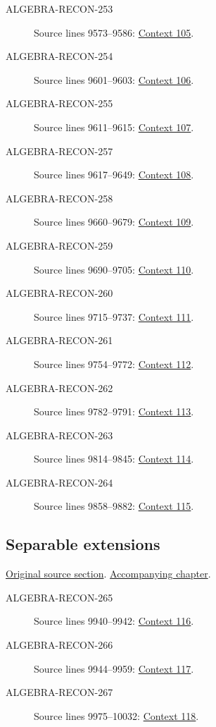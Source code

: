 \begin{description}
\item[ALGEBRA-RECON-253] Source lines 9573--9586: \hyperlink{algebra-context-105}{Context 105}.
\item[ALGEBRA-RECON-254] Source lines 9601--9603: \hyperlink{algebra-context-106}{Context 106}.
\item[ALGEBRA-RECON-255] Source lines 9611--9615: \hyperlink{algebra-context-107}{Context 107}.
\item[ALGEBRA-RECON-257] Source lines 9617--9649: \hyperlink{algebra-context-108}{Context 108}.
\item[ALGEBRA-RECON-258] Source lines 9660--9679: \hyperlink{algebra-context-109}{Context 109}.
\item[ALGEBRA-RECON-259] Source lines 9690--9705: \hyperlink{algebra-context-110}{Context 110}.
\item[ALGEBRA-RECON-260] Source lines 9715--9737: \hyperlink{algebra-context-111}{Context 111}.
\item[ALGEBRA-RECON-261] Source lines 9754--9772: \hyperlink{algebra-context-112}{Context 112}.
\item[ALGEBRA-RECON-262] Source lines 9782--9791: \hyperlink{algebra-context-113}{Context 113}.
\item[ALGEBRA-RECON-263] Source lines 9814--9845: \hyperlink{algebra-context-114}{Context 114}.
\item[ALGEBRA-RECON-264] Source lines 9858--9882: \hyperlink{algebra-context-115}{Context 115}.
\end{description}

\subsection{Separable extensions}
\hypertarget{algebra-source-section-separability}{}
\noindent\href{https://github.com/stacks/stacks-project/blob/a04446e57ec1fbc252a871afcec7752fb2807b14/algebra.tex\#L9906}{Original source section}. \href{algebra.pdf\#nameddest=section-separability}{Accompanying chapter}.

\begin{description}
\item[ALGEBRA-RECON-265] Source lines 9940--9942: \hyperlink{algebra-context-116}{Context 116}.
\item[ALGEBRA-RECON-266] Source lines 9944--9959: \hyperlink{algebra-context-117}{Context 117}.
\item[ALGEBRA-RECON-267] Source lines 9975--10032: \hyperlink{algebra-context-118}{Context 118}.
\end{description}

